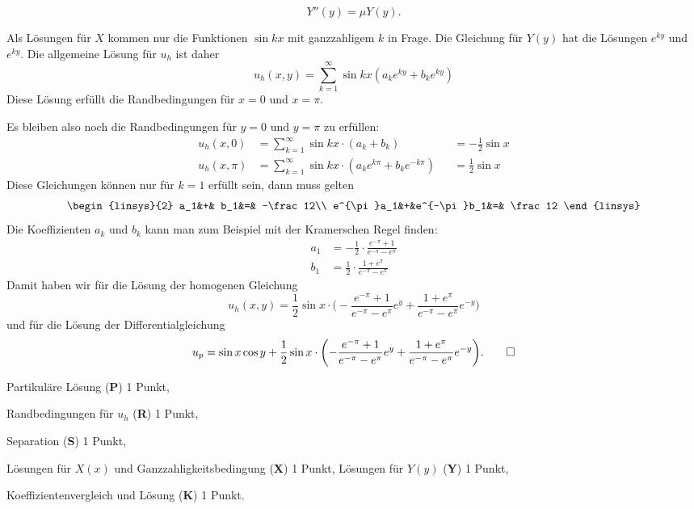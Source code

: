 \begin{loesung}
\begin{teilaufgaben}
\[Y''(y) = \mu Y(y).
\]
\item
Als Lösungen für $X$ kommen nur die Funktionen 
$\sin kx$ mit ganzzahligem $k$ in Frage.
Die Gleichung für $Y(y)$ hat die Lösungen $e^{ky}$ und $e^{ky}$.
Die allgemeine Lösung für $u_h$ ist daher
\[
u_h(x,y)
=
\sum_{k=1}^\infty \sin kx (a_k e^{ky} + b_k e^{ky})
\]
Diese Lösung erfüllt die Randbedingungen für $x=0$ und $x=\pi$.
\item
Es bleiben also noch die Randbedingungen für $y=0$ und $y=\pi$ zu erfüllen:
\begin{equation}
\begin{aligned}
u_h(x,0)   &= \sum_{k=1}^\infty \sin kx \cdot (a_k + b_k)&&=-\frac12\sin x
\\
u_h(x,\pi) &= \sum_{k=1}^\infty \sin kx \cdot (a_ke^{k\pi} + b_ke^{-k\pi}) &&=\frac12\sin x
\end{aligned}
\end{equation}
Diese Gleichungen können nur für $k=1$ erfüllt sein, dann muss gelten
\begin{equation}
\begin{linsys}{2}
       a_1&+&        b_1&=& -\frac12\\
e^{\pi}a_1&+&e^{-\pi}b_1&=&  \frac12
\end{linsys}
\end{equation}
Die Koeffizienten $a_k$ und $b_k$ kann man zum Beispiel mit der Kramerschen
Regel finden:
\begin{align*}
a_1
&=
-\frac12\cdot
\frac{e^{-\pi}+1}{e^{-\pi}-e^{\pi}}
\\
b_1
&=
\frac12\cdot
\frac{1+e^{\pi}}{e^{-\pi}-e^{\pi}}
\end{align*}
Damit haben wir für die Lösung der homogenen Gleichung
\[
u_h(x,y)
=
\frac12
\sin x \cdot \biggl(
-
\frac{e^{-\pi}+1}{e^{-\pi}-e^{\pi}} e^y
+
\frac{1+e^{\pi}}{e^{-\pi}-e^{\pi}} e^{-y}
\biggr)
\]
und für die Lösung der Differentialgleichung
\[
u_p
=
\sin x \cos y
+
\frac12
\sin x \cdot \biggl(
-
\frac{e^{-\pi}+1}{e^{-\pi}-e^{\pi}} e^y
+
\frac{1+e^{\pi}}{e^{-\pi}-e^{\pi}} e^{-y}
\biggr).
\qedhere
\]
\end{teilaufgaben}
\end{loesung}

\begin{bewertung}
\begin{teilaufgaben}
\item
Partikuläre Lösung ({\bf P}) 1 Punkt,
\item
Randbedingungen für $u_h$ ({\bf R}) 1 Punkt,
\item
Separation ({\bf S}) 1 Punkt,
\item
Lösungen für $X(x)$ und Ganzzahligkeitsbedingung ({\bf X}) 1 Punkt,
Lösungen für $Y(y)$ ({\bf Y}) 1 Punkt,
\item
Koeffizientenvergleich und Lösung ({\bf K}) 1 Punkt.
\end{teilaufgaben}
\end{bewertung}




